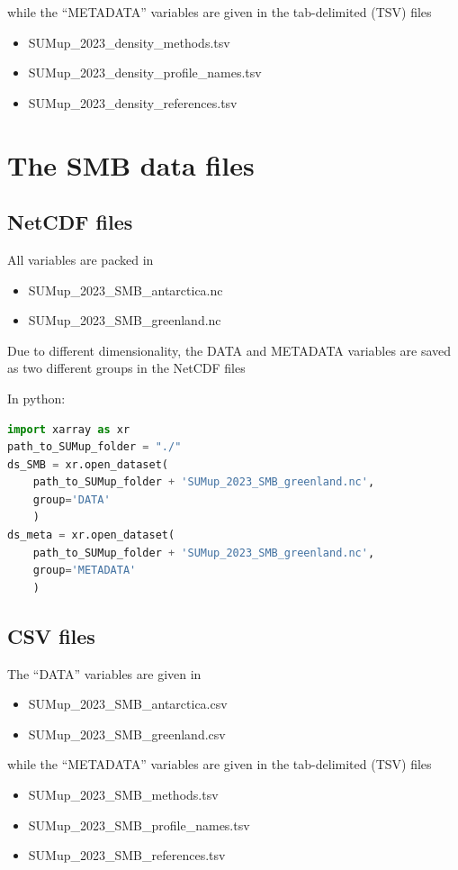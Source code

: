 \documentclass[journal abbreviation, manuscript]{copernicus}
\begin{document}
while the “METADATA” variables are given in the tab-delimited (TSV) files
\begin{itemize}
\item SUMup\_2023\_density\_methods.tsv
\item SUMup\_2023\_density\_profile\_names.tsv
\item SUMup\_2023\_density\_references.tsv
\end{itemize}



\section{The SMB data files}
\subsection{NetCDF files}

All variables are packed in 

\begin{itemize}
\item SUMup\_2023\_SMB\_antarctica.nc
\item SUMup\_2023\_SMB\_greenland.nc
\end{itemize}
Due to different dimensionality, the DATA and METADATA variables are saved as two different groups in the NetCDF files

In python:
\begin{lstlisting}[language=python]
import xarray as xr
path_to_SUMup_folder = "./"
ds_SMB = xr.open_dataset(
    path_to_SUMup_folder + 'SUMup_2023_SMB_greenland.nc', 
    group='DATA'
    )
ds_meta = xr.open_dataset(
    path_to_SUMup_folder + 'SUMup_2023_SMB_greenland.nc',
    group='METADATA'
    )
\end{lstlisting} 

\subsection{CSV files}
The “DATA” variables are given in 
\begin{itemize}
\item SUMup\_2023\_SMB\_antarctica.csv 
\item SUMup\_2023\_SMB\_greenland.csv 
\end{itemize}
while the “METADATA” variables are given in the tab-delimited (TSV) files
\begin{itemize}
\item SUMup\_2023\_SMB\_methods.tsv
\item SUMup\_2023\_SMB\_profile\_names.tsv
\item SUMup\_2023\_SMB\_references.tsv
\end{itemize}
\end{document}
